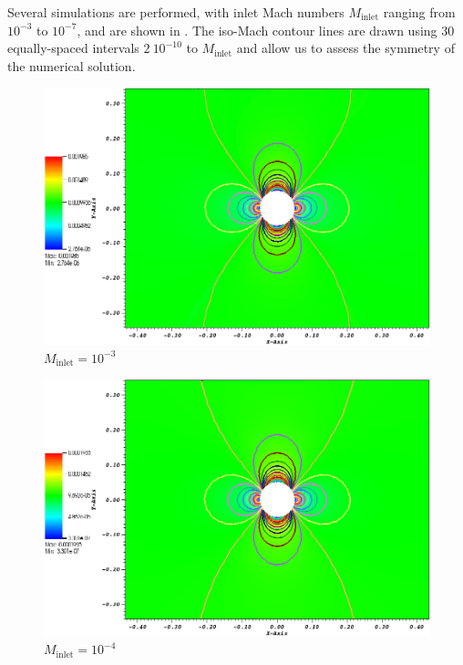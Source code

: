 Several simulations are performed, with inlet Mach numbers $M_{\text{inlet}}$ ranging from $10^{-3}$ to $10^{-7}$, and are shown in . The iso-Mach contour lines are drawn using 30 equally-spaced intervals $2 \ 10^{-10}$ to $M_{\text{inlet}}$ and allow us to assess the symmetry of the numerical solution.
%
        \begin{figure}[H]
                \centering
                \includegraphics[width=\textwidth]{figures/CylinderMach1em3ZoomIn.png}
                \caption{$M_{\text{inlet}}=10^{-3}$}
                \label{fig:cyl_1em3}
        \end{figure}%

        \begin{figure}[H]
                \centering
                \includegraphics[width=\textwidth]{figures/CylinderMach1em4ZoomIn.png}
                \caption{$M_{\text{inlet}}=10^{-4}$}
                \label{fig:cyl_1em4}
        \end{figure}    


